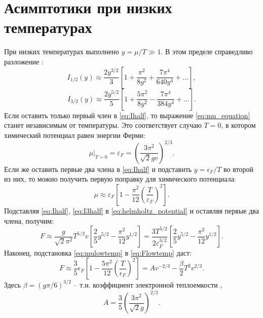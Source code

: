 \section{Асимптотики при низких температурах}
\label{sec:asymp_low}
При низких температурах выполнено $y = \mu / T \gg 1$.
В этом пределе справедливо разложение \cite{Shemyakin:JPA:2010}:
\begin{equation}
    \label{eq:Ihalf}
    I_{1/2}(y) \approx
    \frac{2y^{3/2}}{3}\left[1+\frac{\pi^2}{8y^2}+\frac{7\pi^4}{640y^4} + \ldots\right],
\end{equation}
\begin{equation}
    \label{eq:I3half}
    I_{3/2}(y) \approx \frac{2y^{5/2}}{5}\left[1+\frac{5\pi^2}{8y^2}-\frac{7\pi^4}{384y^4} + \ldots\right].
\end{equation}
Если оставить только первый член в \eqref{eq:Ihalf}, то выражение \eqref{eq:mu_equation} станет независимым от температуры.
Это соответствует случаю $T=0$, в котором химический потенциал равен энергии Ферми:
\begin{equation}
    \mu|_{T = 0} = \varepsilon_F = \left( \frac{3\pi^2}{\sqrt{2}gv} \right)^{2/3}.
\end{equation}
Если же оставить первые два члена в \eqref{eq:Ihalf} и подставить $y = \epsilon_F / T$ во второй из них, то можно получить первую поправку для химического потенциала:
\begin{equation}
    \mu \approx \varepsilon_F\left[
    1 - \frac{\pi^2}{12}\left( \frac{T}{\varepsilon_F} \right)^2 \right].
    \label{eq:mulowtemp}
\end{equation}
Подставляя \eqref{eq:Ihalf}, \eqref{eq:I3half} в \eqref{eq:helmholtz_potential} и оставляя первые два члена, получим:
\begin{equation}
    F \approx \frac{g}{\sqrt{2}\pi^2}T^{5/2}v\left[ \frac{2}{5}y^{5/2} - \frac{\pi^2}{12}y^{1/2} \right]
    = \frac{3T^{5/2}}{2\varepsilon_F^{3/2}}\left[ \frac{2}{5}y^{5/2} - \frac{\pi^2}{12}y^{1/2} \right].
    \label{eq:Flowtemp}
\end{equation}
Наконец, подстановка \eqref{eq:mulowtemp} в \eqref{eq:Flowtemp} даст:
\begin{equation}
    \label{eq:F_lt}
    F \approx \frac{3}{5}\epsilon_F\left[ 1 - \frac{5\pi^2}{12}\left( \frac{T}{\epsilon_F} \right)^2 \right]
    = Av^{-2/3} - \frac{\beta}{2}T^2 v^{2/3}.
\end{equation}
Здесь $\beta = (g \pi / 6)^{3 / 2}$ -- т.н. коэффициент электронной теплоемкости \cite{Landau:statmech:1958},
\begin{equation}
    \label{eq:A_def}
    A = \frac{3}{5}\left( \frac{3\pi^2}{\sqrt{2}g} \right)^{2/3}.
\end{equation}


